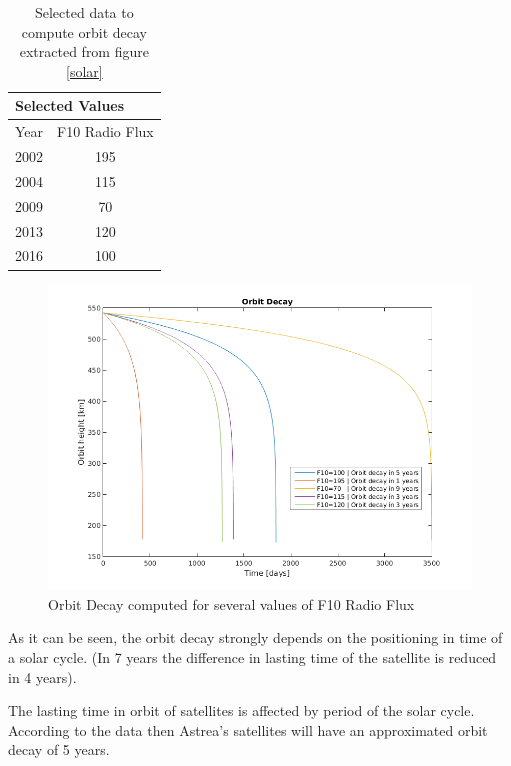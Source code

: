 \begin{table}[H]
\centering
\begin{tabular}{|l|c|}
\hline
\multicolumn{2}{|l|}{Selected Values}      \\ \hline
Year & \multicolumn{1}{l|}{F10 Radio Flux} \\ \hline
2002 & 195                                 \\ \hline
2004 & 115                                 \\ \hline
2009 & 70                                  \\ \hline
2013 & 120                                 \\ \hline
2016 & 100                                 \\ \hline
\end{tabular}
\caption[Selected data to compute orbit decay]{Selected data to compute orbit decay extracted from figure \ref{solar}}
\label{OrbDecCompT}
\end{table}  
\begin{figure}[H] %
\centering
\includegraphics[width=.8\textwidth]{OrbitDecayComp.png}
\caption{Orbit Decay computed for several values of F10 Radio Flux}
\label{fig:OrbitDecayComp}
\end{figure}

As it can be seen, the orbit decay strongly depends on the positioning in time of a solar cycle. (In 7 years the difference in lasting time of the satellite is reduced in 4 years).

The lasting time in orbit of satellites is affected by period of the solar cycle. According to the data then Astrea's satellites will have an approximated orbit decay of 5 years.